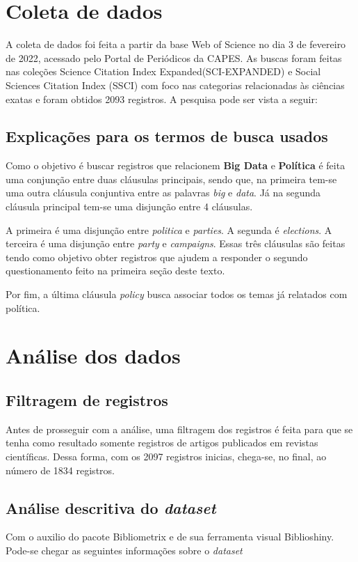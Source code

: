 \section{Coleta de dados}
A coleta de dados foi feita a partir da base Web of Science no dia 3 de fevereiro de 2022, acessado pelo Portal de Periódicos da CAPES. As buscas foram feitas nas coleções Science Citation Index Expanded(SCI-EXPANDED) e Social Sciences Citation Index (SSCI) com foco nas categorias relacionadas às ciências exatas e foram obtidos 2093 registros. A pesquisa pode ser vista a seguir:



\subsection{Explicações para os termos de busca usados}
Como o objetivo é buscar registros que relacionem \textbf{Big Data} e \textbf{Política} é feita uma conjunção entre duas cláusulas principais, sendo que, na primeira tem-se uma outra cláusula conjuntiva entre as palavras \textit{big} e \textit{data}. Já na segunda cláusula principal tem-se uma disjunção entre 4 cláusulas.

A primeira é uma disjunção entre \textit{politica} e \textit{parties}. A segunda é \textit{elections}. A terceira é uma disjunção entre \textit{party} e \textit{campaigns}. Essas três cláusulas são feitas tendo como objetivo obter registros que ajudem a responder o segundo questionamento feito na primeira seção deste texto.

Por fim, a última cláusula \textit{policy} busca associar todos os temas já relatados com política.

\section{Análise dos dados}

\subsection{Filtragem de registros}
Antes de prosseguir com a análise, uma filtragem dos registros é feita para que se tenha como resultado somente registros de artigos publicados em revistas científicas. Dessa forma, com os 2097 registros inicias, chega-se, no final, ao número de 1834 registros.

\subsection{Análise descritiva do \textit{dataset}}

Com o auxilio do pacote Bibliometrix e de sua ferramenta visual Biblioshiny. Pode-se chegar as seguintes informações sobre o \textit{dataset}
